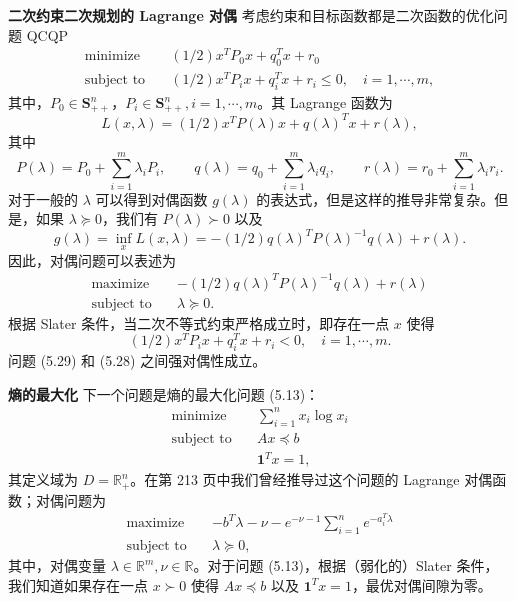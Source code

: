\documentclass[UTF8, 12pt, fontset=fandol, oneside]{ctexart}
\begin{document}
\noindent\textbf{二次约束二次规划的 Lagrange 对偶}\quad
考虑约束和目标函数都是二次函数的优化问题 QCQP
\begin{equation}
\begin{aligned}
\text{minimize}\quad & (1/2)x^TP_0x+q_0^Tx+r_0\\
\text{subject to}\quad & (1/2)x^TP_ix+q_i^Tx+r_i\leq 0,\quad i=1,\cdots,m,
\end{aligned}
\tag{5.28}
\end{equation}
其中，$P_0\in\mathbf{S}_{++}^n$，$P_i\in\mathbf{S}_{++}^n,i=1,\cdots,m$。其 Lagrange 函数为
\[
L(x,\lambda)=(1/2)x^TP(\lambda)x+q(\lambda)^Tx+r(\lambda),
\]
其中
\[
P(\lambda)=P_0+\sum_{i=1}^m\lambda_iP_i,\qquad
q(\lambda)=q_0+\sum_{i=1}^m\lambda_iq_i,\qquad
r(\lambda)=r_0+\sum_{i=1}^m\lambda_i r_i.
\]
对于一般的 $\lambda$ 可以得到对偶函数 $g(\lambda)$ 的表达式，但是这样的推导非常复杂。但是，如果 $\lambda\succeq 0$，我们有 $P(\lambda)\succ 0$ 以及
\[
g(\lambda)=\inf_x L(x,\lambda)=-(1/2)q(\lambda)^TP(\lambda)^{-1}q(\lambda)+r(\lambda).
\]
因此，对偶问题可以表述为
\begin{equation}
\begin{aligned}
\text{maximize}\quad & -(1/2)q(\lambda)^TP(\lambda)^{-1}q(\lambda)+r(\lambda)\\
\text{subject to}\quad & \lambda\succeq 0.
\end{aligned}
\tag{5.29}
\end{equation}
根据 Slater 条件，当二次不等式约束严格成立时，即存在一点 $x$ 使得
\[
(1/2)x^TP_ix+q_i^Tx+r_i<0,\quad i=1,\cdots,m.
\]
问题 (5.29) 和 (5.28) 之间强对偶性成立。

\noindent\textbf{熵的最大化}\quad
下一个问题是熵的最大化问题 (5.13)：
\[
\begin{aligned}
\text{minimize}\quad & \sum_{i=1}^n x_i\log x_i\\
\text{subject to}\quad & Ax\preceq b\\
& \mathbf{1}^Tx=1,
\end{aligned}
\]
其定义域为 $D=\mathbb{R}_+^n$。在第 213 页中我们曾经推导过这个问题的 Lagrange 对偶函数；对偶问题为
\begin{equation}
\begin{aligned}
\text{maximize}\quad & -b^T\lambda-\nu-e^{-\nu-1}\sum_{i=1}^n e^{-a_i^T\lambda}\\
\text{subject to}\quad & \lambda\succeq 0,
\end{aligned}
\tag{5.30}
\end{equation}
其中，对偶变量 $\lambda\in\mathbb{R}^m,\nu\in\mathbb{R}$。对于问题 (5.13)，根据（弱化的）Slater 条件，我们知道如果存在一点 $x\succ 0$ 使得 $Ax\preceq b$ 以及 $\mathbf{1}^Tx=1$，最优对偶间隙为零。
\end{document}
